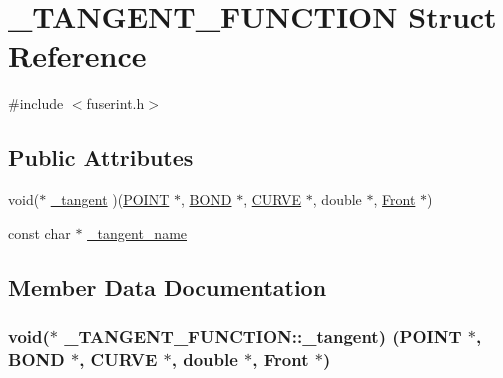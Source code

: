 \hypertarget{struct___t_a_n_g_e_n_t___f_u_n_c_t_i_o_n}{}\section{\+\_\+\+T\+A\+N\+G\+E\+N\+T\+\_\+\+F\+U\+N\+C\+T\+I\+ON Struct Reference}
\label{struct___t_a_n_g_e_n_t___f_u_n_c_t_i_o_n}


{\ttfamily \#include $<$fuserint.\+h$>$}

\subsection*{Public Attributes}
\begin{DoxyCompactItemize}
\item 
void($\ast$ \hyperlink{struct___t_a_n_g_e_n_t___f_u_n_c_t_i_o_n_ad71e85073403882d31546f53b1f38d90}{\+\_\+tangent} )(\hyperlink{int_8h_a3a87c5c9d0146e30a4bf720f701e5a63}{P\+O\+I\+NT} $\ast$, \hyperlink{int_8h_a13b5a9ccac0e6d04386af2ef62582540}{B\+O\+ND} $\ast$, \hyperlink{int_8h_a4c1c272bef898dbaa20b055af85cd685}{C\+U\+R\+VE} $\ast$, double $\ast$, \hyperlink{fdecs_8h_ac32202b798f848095c489cfd04c4ca5f}{Front} $\ast$)
\item 
const char $\ast$ \hyperlink{struct___t_a_n_g_e_n_t___f_u_n_c_t_i_o_n_a71d75595b59e6ebe0f3972d4e1570afc}{\+\_\+tangent\+\_\+name}
\end{DoxyCompactItemize}


\subsection{Member Data Documentation}
\subsubsection[{\texorpdfstring{\+\_\+tangent}{_tangent}}]{\setlength{\rightskip}{0pt plus 5cm}void($\ast$ \+\_\+\+T\+A\+N\+G\+E\+N\+T\+\_\+\+F\+U\+N\+C\+T\+I\+O\+N\+::\+\_\+tangent) ({\bf P\+O\+I\+NT} $\ast$, {\bf B\+O\+ND} $\ast$, {\bf C\+U\+R\+VE} $\ast$, double $\ast$, {\bf Front} $\ast$)}\hypertarget{struct___t_a_n_g_e_n_t___f_u_n_c_t_i_o_n_ad71e85073403882d31546f53b1f38d90}{}\label{struct___t_a_n_g_e_n_t___f_u_n_c_t_i_o_n_ad71e85073403882d31546f53b1f38d90}
